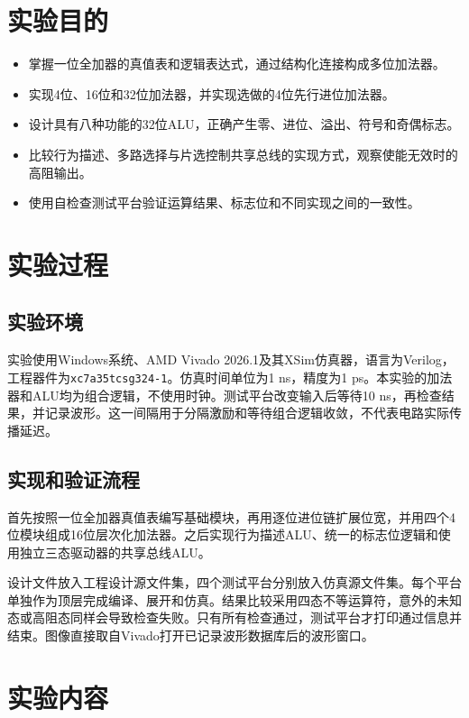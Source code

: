 \documentclass[12pt,a4paper]{ctexart}
\title{\reporttitle}
\author{姓名：\authname\quad 班级：\class\\学号：\authid}
\date{2026年11月16日}
\begin{document}
\maketitle
\tableofcontents
\newpage
\section{实验目的}
\begin{itemize}
\item 掌握一位全加器的真值表和逻辑表达式，通过结构化连接构成多位加法器。
\item 实现4位、16位和32位加法器，并实现选做的4位先行进位加法器。
\item 设计具有八种功能的32位ALU，正确产生零、进位、溢出、符号和奇偶标志。
\item 比较行为描述、多路选择与片选控制共享总线的实现方式，观察使能无效时的高阻输出。
\item 使用自检查测试平台验证运算结果、标志位和不同实现之间的一致性。
\end{itemize}
\section{实验过程}
\subsection{实验环境}
实验使用Windows系统、AMD Vivado 2026.1及其XSim仿真器，语言为Verilog，工程器件为\texttt{xc7a35tcsg324-1}。仿真时间单位为1 ns，精度为1 ps。本实验的加法器和ALU均为组合逻辑，不使用时钟。测试平台改变输入后等待10 ns，再检查结果，并记录波形。这一间隔用于分隔激励和等待组合逻辑收敛，不代表电路实际传播延迟。

\subsection{实现和验证流程}
首先按照一位全加器真值表编写基础模块，再用逐位进位链扩展位宽，并用四个4位模块组成16位层次化加法器。之后实现行为描述ALU、统一的标志位逻辑和使用独立三态驱动器的共享总线ALU。

设计文件放入工程设计源文件集，四个测试平台分别放入仿真源文件集。每个平台单独作为顶层完成编译、展开和仿真。结果比较采用四态不等运算符，意外的未知态或高阻态同样会导致检查失败。只有所有检查通过，测试平台才打印通过信息并结束。图像直接取自Vivado打开已记录波形数据库后的波形窗口。

\section{实验内容}
\end{document}
